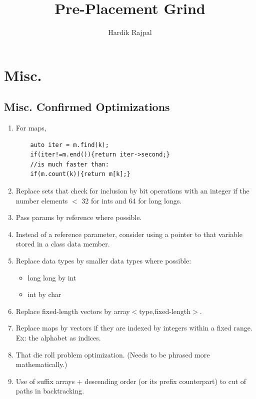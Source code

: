 \documentclass{report}
\author{Hardik Rajpal}
\begin{document}


\lstset{style=mystyle}
\title{Pre-Placement Grind}
\maketitle
\tableofcontents
\pagebreak
\chapter{Misc.}
\section{Misc. Confirmed Optimizations}
\begin{enumerate}
    \item For maps,
\begin{lstlisting}
    auto iter = m.find(k);
    if(iter!=m.end()){return iter->second;}
    //is much faster than:
    if(m.count(k)){return m[k];}
\end{lstlisting}
    \item Replace sets that check for inclusion by bit operations with an integer if the number elements $<$ 32 for ints and 64 for long longs. 
    \item Pass params by reference where possible.
    \item Instead of a reference parameter, consider using a pointer to that variable stored in a class data member.
    \item Replace data types by smaller data types where possible:
        \begin{itemize}
            \item long long by int
            \item int by char
        \end{itemize} 
    \item Replace fixed-length vectors by array$<$type,fixed-length$>$.
    \item Replace maps by vectors if they are indexed by integers within a fixed range. Ex: the alphabet as indices.
    \item That die roll problem optimization. (Needs to be phrased more mathematically.)
    \item Use of suffix arrays + descending order (or its prefix counterpart) to cut of paths in backtracking.
\end{enumerate}
\end{document}
